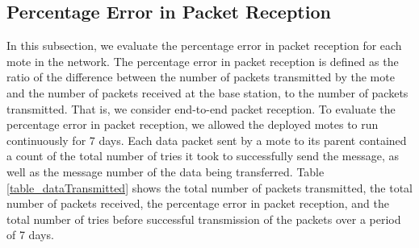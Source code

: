 \subsection{Percentage Error in Packet Reception}\label{sec:percentage_error}
In this subsection, we evaluate the percentage error in packet reception for each mote in the network. The percentage error in packet reception is defined as the ratio of the difference between the number of packets transmitted by the mote and the number of packets received at the base station, to the number of packets transmitted. That is, we consider end-to-end packet reception. To evaluate the percentage error in packet reception, we allowed the deployed motes to run continuously for 7 days. Each data packet sent by a mote to its parent contained a count of the total number of tries it took to successfully send the message, as well as the message number of the data being transferred. Table \ref{table_dataTransmitted} shows the total number of packets transmitted, the total number of packets received, the percentage error in packet reception, and the total number of tries before successful transmission of the packets over a period of 7 days.


